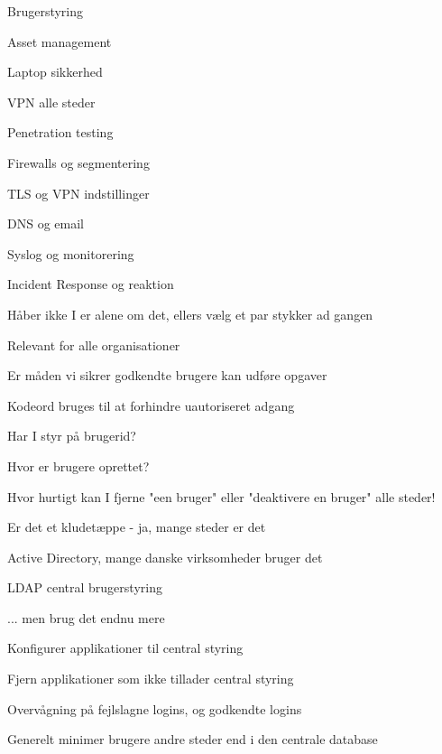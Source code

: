\documentclass[Screen16to9,17pt]{foils}
\begin{document}

\begin{list2}
\item Brugerstyring
\item Asset management
\item Laptop sikkerhed
\item VPN alle steder
\item Penetration testing
\item Firewalls og segmentering
\item TLS og VPN indstillinger
\item DNS og email
\item Syslog og monitorering
\item Incident Response og reaktion
\end{list2}

\vskip 5mm
\centerline{Håber ikke I er alene om det, ellers vælg et par stykker ad gangen}



\begin{list2}
\item Relevant for alle organisationer
\item Er måden vi sikrer godkendte brugere kan udføre opgaver
\item Kodeord bruges til at forhindre uautoriseret adgang
\item Har I styr på brugerid?
\item Hvor er brugere oprettet?
\item Hvor hurtigt kan I fjerne "een bruger" eller "deaktivere en bruger" alle steder!
\item Er det et kludetæppe - ja, mange steder er det
\end{list2}



\begin{list1}
\item Active Directory, mange danske virksomheder bruger det
\item LDAP central brugerstyring
\item ... men brug det endnu mere
\begin{list2}
\item Konfigurer applikationer til central styring
\item Fjern applikationer som ikke tillader central styring
\item Overvågning på fejlslagne logins, og godkendte logins
\end{list2}
\item Generelt minimer brugere andre steder end i den centrale database
\end{list1}
\end{document}
